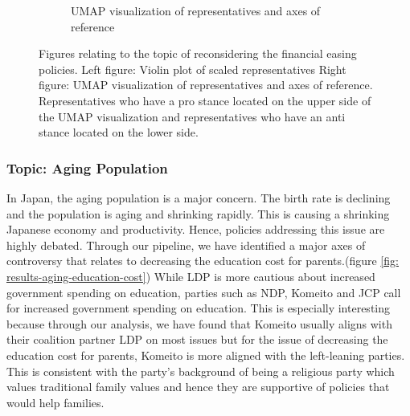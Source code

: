 \documentclass[final,5p,times,twocolumn,authoryear]{elsarticle}
\begin{document}
\begin{figure}[h]
\begin{subfigure}{0.22\textwidth}
      \caption{UMAP visualization of representatives and axes of reference}
    \end{subfigure}
\caption{Figures relating to the topic of reconsidering the financial easing policies. Left figure: Violin plot of scaled representatives Right figure: UMAP visualization of representatives and axes of reference. Representatives who have a pro stance located on the upper side of the UMAP visualization and representatives who have an anti stance located on the lower side.}
\label{fig: results-economy-financial-easing}
\end{figure}
\FloatBarrier

\subsubsection{Topic: Aging Population}


In Japan, the aging population is a major concern. The birth rate is declining and the population is aging and shrinking rapidly. This is causing a shrinking Japanese economy and productivity. Hence, policies addressing this issue are highly debated. Through our pipeline, we have identified a major axes of controversy that relates to decreasing the education cost for parents.(figure \ref{fig: results-aging-education-cost}) While LDP is more cautious about increased government spending on education, parties such as NDP, Komeito and JCP call for increased government spending on education. This is especially interesting because through our analysis, we have found that Komeito usually aligns with their coalition partner LDP on most issues but for the issue of decreasing the education cost for parents, Komeito is more aligned with the left-leaning parties. This is consistent with the party's background of being a religious party which values traditional family values and hence they are supportive of policies that would help families.
\end{document}
